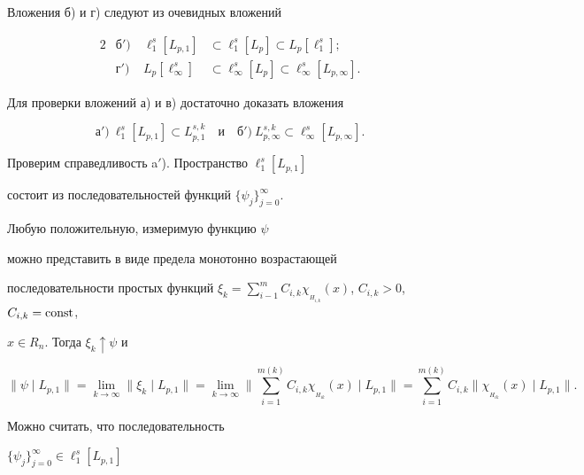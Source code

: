 \begin{pf}


Вложения б) и г) следуют из очевидных вложений


\begin{alignat*}{2}


&\text{б}') &\ \ell^s_1[L_{p,1}] &\subset \ell^s_1[L_p]


\subset L_p[\ell^s_1]; \\


%


&\text{г}')&\ L_p[\ell^s_{\infty} ] &\subset \ell^s_{\infty }[L_p] \subset


\ell^s_{\infty }[L_{p,\infty }].


\end{alignat*}


Для проверки вложений а) и в) достаточно доказать вложения


$$


\text{а}')\ \ell^s_1[L_{p,1}] \subset L^{s,k}_{p,1} \quad \text{и} \quad


\text{б}')


\ L^{s,k}_{p,\infty } \subset \ell^s_{\infty }[L_{p,\infty }].


$$


Проверим справедливость a$'$). Пространство $\ell^s_1[L_{p,1}]$


состоит из последовательностей функций $\{ \psi_j\}^{\infty}_{j=0}$.


Любую положительную, измеримую функцию $\psi$


можно представить в виде предела монотонно возрастающей


последовательности простых функций $\xi_k=\sum\limits^m_{i-1}


C_{i,k}\chi_{_{H_{i,k}}}(x)$, $C_{i,k}>0$, $C_{i,k}=\const$,


$x\in R_n$. Тогда $\xi_k\uparrow \psi$ и


$$


\| \psi \mid L_{p,1} \|=\lim_{k\rightarrow \infty }\| \xi_k\mid L_{p,1}\|=


\lim_{k\rightarrow \infty }\bigg\| \sum^{m(k)}_{i=1}


C_{i,k}\chi_{_{H_{ik}}}(x)\mid L_{p,1} \bigg\|=


\sum^{m(k)}_{i=1} C_{i,k}\| \chi_{_{H_{ik}}}(x)\mid L_{p,1} \|.


$$


Можно считать, что последовательность


$\{\psi_j\}^{\infty}_{j=0} \in \ell^s_1[L_{p,1}]$



\end{pf}
